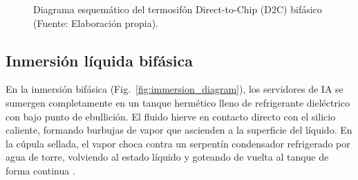 \begin{figure}[htbp]
\centering
{}
\caption{Diagrama esquem\'atico del termosif\'on Direct-to-Chip (D2C) bif\'asico (Fuente: Elaboraci\'on propia).}
\label{fig:d2c_diagram}
\end{figure}

\subsection{Inmersi\'on l\'iquida bif\'asica}
En la inmersi\'on bif\'asica (Fig.~\ref{fig:immersion_diagram}), los servidores de IA se sumergen completamente en un tanque herm\'etico lleno de refrigerante diel\'ectrico con bajo punto de ebullici\'on. El fluido hierve en contacto directo con el silicio caliente, formando burbujas de vapor que ascienden a la superficie del l\'iquido. En la c\'upula sellada, el vapor choca contra un serpent\'in condensador refrigerado por agua de torre, volviendo al estado l\'iquido y goteando de vuelta al tanque de forma continua \cite{mudawar2001}.

